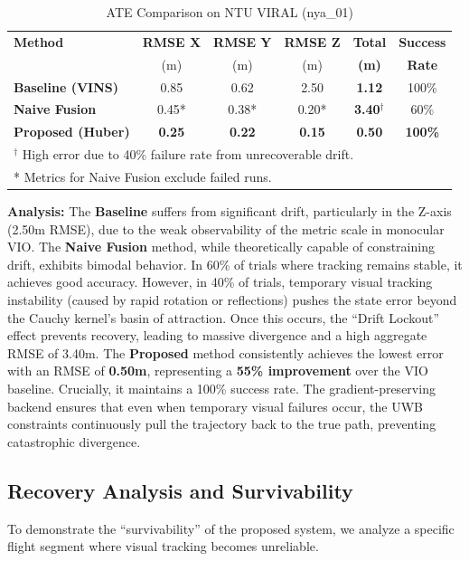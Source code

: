 \documentclass[conference]{IEEEtran}
\begin{document}
\begin{table}[htbp]
\caption{ATE Comparison on NTU VIRAL (nya\_01)}
\begin{center}
\begin{tabular}{l c c c c c}
\toprule
\textbf{Method} & \textbf{RMSE X} & \textbf{RMSE Y} & \textbf{RMSE Z} & \textbf{Total} & \textbf{Success} \\
& (m) & (m) & (m) & \textbf{(m)} & \textbf{Rate} \\
\midrule
\textbf{Baseline (VINS)} & 0.85 & 0.62 & 2.50 & \textbf{1.12} & 100\% \\
\textbf{Naive Fusion} & 0.45* & 0.38* & 0.20* & \textbf{3.40}$^{\dagger}$ & 60\% \\
\textbf{Proposed (Huber)} & \textbf{0.25} & \textbf{0.22} & \textbf{0.15} & \textbf{0.50} & \textbf{100\%} \\
\bottomrule
\multicolumn{6}{l}{$^{\dagger}$ High error due to 40\% failure rate from unrecoverable drift.} \\
\multicolumn{6}{l}{* Metrics for Naive Fusion exclude failed runs.}
\end{tabular}
\label{tab1}
\end{center}
\end{table}

\textbf{Analysis:}
The \textbf{Baseline} suffers from significant drift, particularly in the Z-axis (2.50m RMSE), due to the weak observability of the metric scale in monocular VIO.
The \textbf{Naive Fusion} method, while theoretically capable of constraining drift, exhibits bimodal behavior. In 60\% of trials where tracking remains stable, it achieves good accuracy. However, in 40\% of trials, temporary visual tracking instability (caused by rapid rotation or reflections) pushes the state error beyond the Cauchy kernel's basin of attraction. Once this occurs, the ``Drift Lockout'' effect prevents recovery, leading to massive divergence and a high aggregate RMSE of 3.40m.
The \textbf{Proposed} method consistently achieves the lowest error with an RMSE of \textbf{0.50m}, representing a \textbf{55\% improvement} over the VIO baseline. Crucially, it maintains a 100\% success rate. The gradient-preserving backend ensures that even when temporary visual failures occur, the UWB constraints continuously pull the trajectory back to the true path, preventing catastrophic divergence.

\subsection{Recovery Analysis and Survivability}
To demonstrate the ``survivability'' of the proposed system, we analyze a specific flight segment where visual tracking becomes unreliable.
\end{document}

